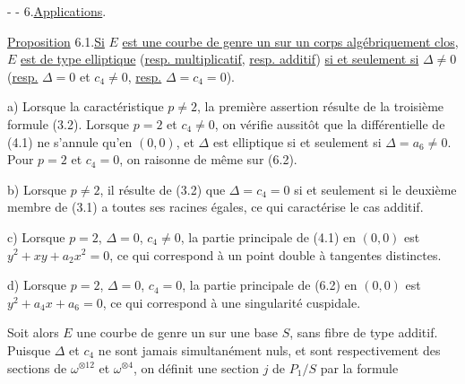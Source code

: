 -  -
6.\quad \uline{Applications}.

\uline{Proposition} 6.1.\quad \uline{Si} $E$ \uline{est une courbe de genre un sur un corps algébriquement clos}, $E$ \uline{est de type elliptique} (\uline{resp. multiplicatif}, \uline{resp. additif}) \uline{si et seulement si} $\Delta\ne0$ (\uline{resp.} $\Delta=0$ et $c_4\ne0$, \uline{resp.} $\Delta=c_4=0$).

a) Lorsque la caractéristique $p\ne2$, la première assertion résulte de la troisième formule (3.2). Lorsque $p=2$ et $c_4\ne0$, on vérifie aussitôt que la différentielle de (4.1) ne s'annule qu'en $(0,0)$, et $\Delta$ est elliptique si et seulement si $\Delta=a_6\ne0$. Pour $p=2$ et $c_4=0$, on raisonne de même sur (6.2).

b) Lorsque $p\ne2$, il résulte de (3.2) que $\Delta=c_4=0$ si et seulement si le deuxième membre de (3.1) a toutes ses racines égales, ce qui caractérise le cas additif.

c) Lorsque $p=2$, $\Delta=0$, $c_4\ne0$, la partie principale de (4.1) en $(0,0)$ est $y^2+xy+a_2x^2=0$, ce qui correspond à un point double à tangentes distinctes.

d) Lorsque $p=2$, $\Delta=0$, $c_4=0$, la partie principale de (6.2) en $(0,0)$ est $y^2+a_4x+a_6=0$, ce qui correspond à une singularité cuspidale.

Soit alors $E$ une courbe de genre un sur une base $S$, sans fibre de type additif. Puisque $\Delta$ et $c_4$ ne sont jamais simultanément nuls, et sont respectivement des sections de $\omega^{\otimes12}$ et $\omega^{\otimes4}$, on définit une section $j$ de $P_1/S$ par la formule
